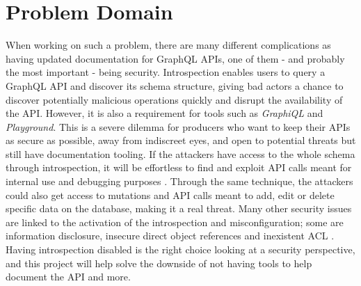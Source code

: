 \section*{Problem Domain}
\label{s:Problem-Domain}
When working on such a problem, there are many different complications as having
updated documentation for GraphQL APIs, one of them - and probably the most
important - being security. Introspection enables users to query a GraphQL API
and discover its schema structure, giving bad actors a chance to discover
potentially malicious operations \citep{khalilWhyYouShould2021} quickly and
disrupt the availability of the API. However, it is also a requirement for tools
such as \textit{GraphiQL} and \textit{Playground}. This is a severe dilemma for
producers who want to keep their APIs as secure as possible, away from
indiscreet eyes, and open to potential threats but still have documentation
tooling. If the attackers have access to the whole schema through introspection,
it will be effortless to find and exploit API calls meant for internal use and
debugging purposes \citep{rizwanGraphQLCommonVulnerabilities2021}. Through the
same technique, the attackers could also get access to mutations and API calls
meant to add, edit or delete specific data on the database, making it a real
threat. Many other security issues are linked to the activation of the
introspection and misconfiguration; some are information disclosure, insecure
direct object references and inexistent ACL \citep{
yeswehackHowExploitGraphQL2021}. Having introspection disabled is the right
choice looking at a security perspective, and this project will help solve the
downside of not having tools to help document the API and more.

